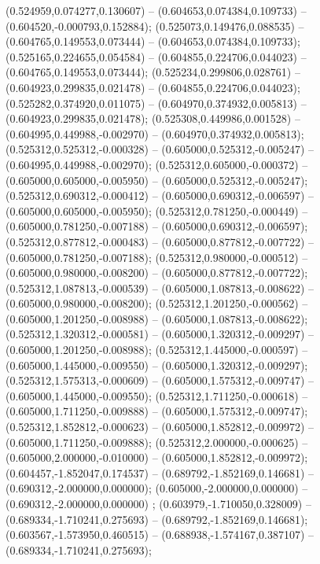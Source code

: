  (0.524959,0.074277,0.130607) -- (0.604653,0.074384,0.109733) -- (0.604520,-0.000793,0.152884);
 (0.525073,0.149476,0.088535) -- (0.604765,0.149553,0.073444) -- (0.604653,0.074384,0.109733);
 (0.525165,0.224655,0.054584) -- (0.604855,0.224706,0.044023) -- (0.604765,0.149553,0.073444);
 (0.525234,0.299806,0.028761) -- (0.604923,0.299835,0.021478) -- (0.604855,0.224706,0.044023);
 (0.525282,0.374920,0.011075) -- (0.604970,0.374932,0.005813) -- (0.604923,0.299835,0.021478);
 (0.525308,0.449986,0.001528) -- (0.604995,0.449988,-0.002970) -- (0.604970,0.374932,0.005813);
 (0.525312,0.525312,-0.000328) -- (0.605000,0.525312,-0.005247) -- (0.604995,0.449988,-0.002970);
 (0.525312,0.605000,-0.000372) -- (0.605000,0.605000,-0.005950) -- (0.605000,0.525312,-0.005247);
 (0.525312,0.690312,-0.000412) -- (0.605000,0.690312,-0.006597) -- (0.605000,0.605000,-0.005950);
 (0.525312,0.781250,-0.000449) -- (0.605000,0.781250,-0.007188) -- (0.605000,0.690312,-0.006597);
 (0.525312,0.877812,-0.000483) -- (0.605000,0.877812,-0.007722) -- (0.605000,0.781250,-0.007188);
 (0.525312,0.980000,-0.000512) -- (0.605000,0.980000,-0.008200) -- (0.605000,0.877812,-0.007722);
 (0.525312,1.087813,-0.000539) -- (0.605000,1.087813,-0.008622) -- (0.605000,0.980000,-0.008200);
 (0.525312,1.201250,-0.000562) -- (0.605000,1.201250,-0.008988) -- (0.605000,1.087813,-0.008622);
 (0.525312,1.320312,-0.000581) -- (0.605000,1.320312,-0.009297) -- (0.605000,1.201250,-0.008988);
 (0.525312,1.445000,-0.000597) -- (0.605000,1.445000,-0.009550) -- (0.605000,1.320312,-0.009297);
 (0.525312,1.575313,-0.000609) -- (0.605000,1.575312,-0.009747) -- (0.605000,1.445000,-0.009550);
 (0.525312,1.711250,-0.000618) -- (0.605000,1.711250,-0.009888) -- (0.605000,1.575312,-0.009747);
 (0.525312,1.852812,-0.000623) -- (0.605000,1.852812,-0.009972) -- (0.605000,1.711250,-0.009888);
 (0.525312,2.000000,-0.000625) -- (0.605000,2.000000,-0.010000) -- (0.605000,1.852812,-0.009972);
 (0.604457,-1.852047,0.174537) -- (0.689792,-1.852169,0.146681) -- (0.690312,-2.000000,0.000000);
 (0.605000,-2.000000,0.000000) -- (0.690312,-2.000000,0.000000) ;
 (0.603979,-1.710050,0.328009) -- (0.689334,-1.710241,0.275693) -- (0.689792,-1.852169,0.146681);
 (0.603567,-1.573950,0.460515) -- (0.688938,-1.574167,0.387107) -- (0.689334,-1.710241,0.275693);
